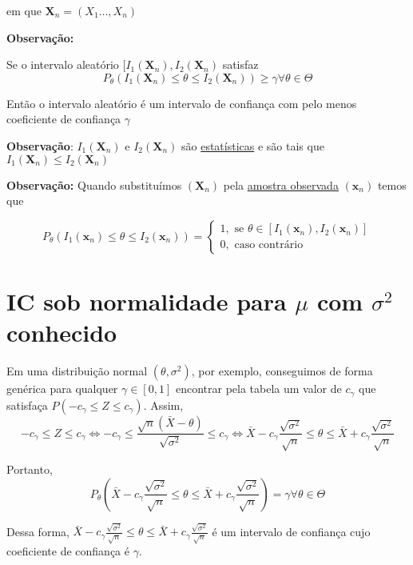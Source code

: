 \documentclass[
  letterpaper,
  DIV=11,
  numbers=noendperiod]{scrreprt}
\begin{document}
em que \(\pmb{X}_{n} = (X_{1}\ldots,X_{n})\)

\textbf{Observação:}

Se o intervalo aleatório \([I_{1} (\pmb{X}_{n}),I_{2}(\pmb{X}_{n})\)
satisfaz \[
P_{\theta} (I_{1} (\pmb{X}_{n}) \leq \theta \leq I_{2} (\pmb{X}_{n})) \geq \gamma \forall \theta \in \Theta
\]

Então o intervalo aleatório é um intervalo de confiança com pelo menos
coeficiente de confiança \(\gamma\)

\textbf{Observação}: \(I_{1} (\pmb{X}_{n})\) e \(I_{2} (\pmb{X}_{n})\)
são \href{estatisticas.qmd}{estatísticas} e são tais que
\(I_{1} (\pmb{X}_{n}) \leq I_{2} (\pmb{X}_{n})\)

\textbf{Observação:} Quando substituímos \((\pmb{X}_{n})\) pela
\hyperref[sec-ao]{amostra observada} \((\pmb{x}_{n})\) temos que

\[
P_{\theta}(I_{1} (\pmb{x}_{n}) \leq \theta \leq I_{2} (\pmb{x}_{n})) = \begin{cases}
1,  \text{ se } \theta \in [I_{1}(\pmb{x}_{n}), I_{2} (\pmb{x}_{n})] \\
0, \text{ caso contrário }
\end{cases}
\]

\section{\texorpdfstring{IC sob normalidade para \(\mu\) com
\(\sigma^2\)
conhecido}{IC sob normalidade para \textbackslash mu com \textbackslash sigma\^{}2 conhecido}}\label{ic-sob-normalidade-para-mu-com-sigma2-conhecido}

Em uma distribuição normal \((\theta, \sigma^2)\), por exemplo,
conseguimos de forma genérica para qualquer \(\gamma \in [0,1]\)
encontrar pela tabela um valor de \(c_{\gamma}\) que satisfaça
\(P(-c_{\gamma} \leq Z \leq c_{\gamma})\). Assim, \[
-c_{\gamma} \leq Z \leq c_{\gamma} \Leftrightarrow -c_{\gamma} \leq \frac{\sqrt{n}(\bar{X}-\theta)}{\sqrt{\sigma^{2}}}
\leq c_{\gamma} \Leftrightarrow \bar{X} - c_{\gamma} \frac{\sqrt{\sigma^2}}{\sqrt{n}} \leq \theta \leq \bar{X} + c_{\gamma}
\frac{\sqrt{\sigma^2}}{\sqrt{n}}
\]

Portanto, \[
P_{\theta}\left(\bar{X} - c_{\gamma} \frac{\sqrt{\sigma^2}}{\sqrt{n}} \leq \theta \leq \bar{X} + c_{\gamma}
\frac{\sqrt{\sigma^2}}{\sqrt{n}}\right) = \gamma \forall \theta \in \Theta
\]

Dessa forma,
\(\bar{X} - c_{\gamma} \frac{\sqrt{\sigma^2}}{\sqrt{n}} \leq \theta \leq \bar{X} + c_{\gamma}
\frac{\sqrt{\sigma^2}}{\sqrt{n}}\) é um intervalo de confiança cujo
coeficiente de confiança é \(\gamma\).
\end{document}
